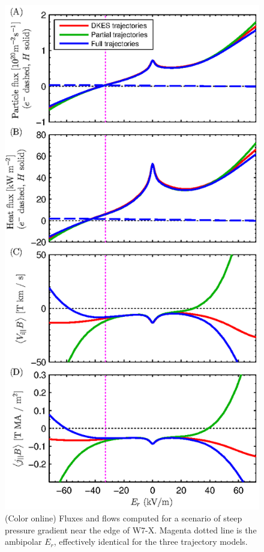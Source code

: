 \documentclass[12pt,superscriptaddress]{revtex4}
\begin{document}
\begin{figure}[h!]
\includegraphics{m20131212_02_PlotSFINCS2SpeciesEScanForPaper.eps}
\caption{(Color online)
Fluxes and flows computed for a scenario of steep pressure gradient near the edge of W7-X.
Magenta dotted line is the ambipolar $E_r$, effectively identical for the three
trajectory models.
\label{fig:2species}}
\end{figure}
\end{document}

